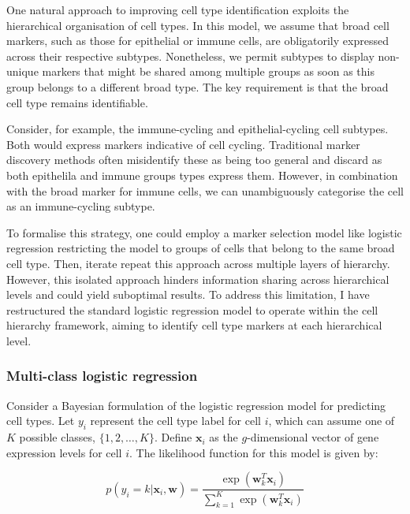One natural approach to improving cell type identification exploits the hierarchical organisation of cell types. In this model, we assume that broad cell markers, such as those for epithelial or immune cells, are obligatorily expressed across their respective subtypes. Nonetheless, we permit subtypes to display non-unique markers that might be shared among multiple groups as soon as this group belongs to a different broad type. The key requirement is that the broad cell type remains identifiable.

Consider, for example, the immune-cycling and epithelial-cycling cell subtypes. Both would express markers indicative of cell cycling. Traditional marker discovery methods often misidentify these as being too general and discard as both epithelila and immune groups types express them. However, in combination with the broad marker for immune cells, we can unambiguously categorise the cell as an immune-cycling subtype.

To formalise this strategy, one could employ a marker selection model like logistic regression restricting the model to groups of cells that belong to the same broad cell type. Then, iterate repeat this approach across multiple layers of hierarchy. However, this isolated approach hinders information sharing across hierarchical levels and could yield suboptimal results. To address this limitation, I have restructured the standard logistic regression model to operate within the cell hierarchy framework, aiming to identify cell type markers at each hierarchical level.

\subsubsection*{Multi-class logistic regression}

Consider a Bayesian formulation of the logistic regression model for predicting cell types. Let $y_i$ represent the cell type label for cell $i$, which can assume one of $K$ possible classes, $\{1, 2, \ldots, K\}$. Define $\mathbf{x}_i$ as the $g$-dimensional vector of gene expression levels for cell $i$. The likelihood function for this model is given by:

\begin{equation}
    \label{eq:logistic-regression-likelihood}
    p(y_i = k | \mathbf{x}_i, \mathbf{w}) = \frac{\exp(\mathbf{w}_{k}^T \mathbf{x}_i)}{\sum_{k=1}^{K} \exp(\mathbf{w}_{k}^T \mathbf{x}_i)}
\end{equation}


